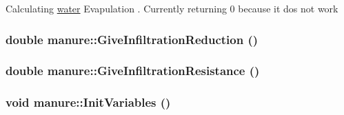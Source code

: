\label{classmanure_a6aba3f146ff412c234583f5f1c805000}
Calculating \hyperlink{classwater}{water} Evapulation . Currently returning 0 because it dos not work \hypertarget{classmanure_aa8504fd1f545f75b143d76c8991b2b87}{
\subsubsection[{GiveInfiltrationReduction}]{\setlength{\rightskip}{0pt plus 5cm}double manure::GiveInfiltrationReduction ()}}
\label{classmanure_aa8504fd1f545f75b143d76c8991b2b87}
\hypertarget{classmanure_a0f2eab386e559113dba56d6d8cfb55e7}{
\subsubsection[{GiveInfiltrationResistance}]{\setlength{\rightskip}{0pt plus 5cm}double manure::GiveInfiltrationResistance ()}}
\label{classmanure_a0f2eab386e559113dba56d6d8cfb55e7}
\hypertarget{classmanure_ac45a5d29b499ebe4f93a8473dc2cf821}{
\subsubsection[{InitVariables}]{\setlength{\rightskip}{0pt plus 5cm}void manure::InitVariables ()}}
\label{classmanure_ac45a5d29b499ebe4f93a8473dc2cf821}


